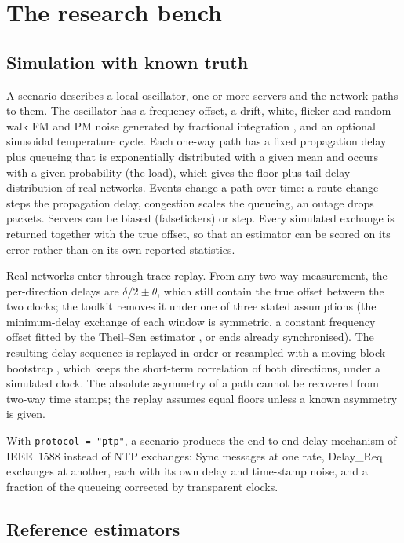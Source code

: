 \documentclass[11pt,a4paper]{article}
\begin{document}
\section{The research bench}\label{sec:bench}

\subsection{Simulation with known truth}

A scenario describes a local oscillator, one or more servers and the network paths to them. The
oscillator has a frequency offset, a drift, white, flicker and random-walk FM and PM noise generated
by fractional integration \citep{kasdin1992}, and an optional sinusoidal temperature cycle. Each one-way
path has a fixed propagation delay plus queueing that is exponentially distributed with a given mean
and occurs with a given probability (the load), which gives the floor-plus-tail delay distribution of
real networks. Events change a path over time: a route change steps the propagation delay, congestion
scales the queueing, an outage drops packets. Servers can be biased (falsetickers) or step. Every
simulated exchange is returned together with the true offset, so that an estimator can be scored on
its error rather than on its own reported statistics.

Real networks enter through trace replay. From any two-way measurement, the per-direction delays are
$\delta/2 \pm \theta$, which still contain the true offset between the two clocks; the toolkit removes
it under one of three stated assumptions (the minimum-delay exchange of each window is symmetric, a
constant frequency offset fitted by the Theil--Sen estimator \citep{theil1950,sen1968}, or ends already
synchronised). The resulting delay sequence is replayed in order or resampled with a moving-block
bootstrap \citep{kunsch1989}, which keeps the short-term correlation of both directions, under a
simulated clock. The absolute asymmetry of a path cannot be recovered from two-way time stamps; the
replay assumes equal floors unless a known asymmetry is given.

With \texttt{protocol = "ptp"}, a scenario produces the end-to-end delay mechanism of IEEE~1588 instead
of NTP exchanges: Sync messages at one rate, Delay\_Req exchanges at another, each with its own delay and
time-stamp noise, and a fraction of the queueing corrected by transparent clocks.

\subsection{Reference estimators}
\end{document}
